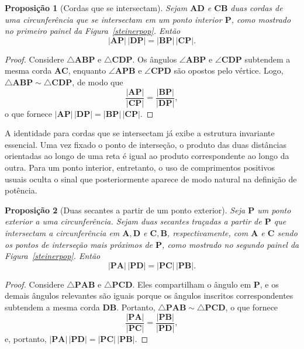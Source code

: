\documentclass[12pt,a4paper]{article}
\newcommand{\pt}[1]{\mathbf{#1}}
\newcommand{\seg}[1]{\mathbf{#1}}
\newcommand{\seglen}[1]{\lvert\mathbf{#1}\rvert}
\newcommand{\be}{\begin{equation}}
\newcommand{\ee}{\end{equation}}
\numberwithin{equation}{section}
\newtheorem{proposition}{Proposição}[section]
\theoremstyle{remark}
\begin{document}
\begin{proposition}[Cordas que se intersectam]
\label{pop2chords}
Sejam $\seg{AD}$ e $\seg{CB}$ duas cordas de uma circunferência que se intersectam em um ponto interior $\pt{P}$, como mostrado no primeiro painel da Figura~\ref{steinerpop}. Então
\be
\seglen{AP}\,\seglen{DP}=\seglen{BP}\,\seglen{CP}.
\ee
\end{proposition}

\begin{proof}
Considere $\triangle \mathbf{ABP}$ e $\triangle \mathbf{CDP}$. Os ângulos $\angle \mathbf{ABP}$ e $\angle \mathbf{CDP}$ subtendem a mesma corda $\seg{AC}$, enquanto $\angle \mathbf{APB}$ e $\angle \mathbf{CPD}$ são opostos pelo vértice. Logo, $\triangle \mathbf{ABP}\sim\triangle \mathbf{CDP}$, de modo que
\be
\frac{\seglen{AP}}{\seglen{CP}}=\frac{\seglen{BP}}{\seglen{DP}},
\ee
o que fornece $\seglen{AP}\,\seglen{DP}=\seglen{BP}\,\seglen{CP}$.
\end{proof}

A identidade para cordas que se intersectam já exibe a estrutura invariante essencial. Uma vez fixado o ponto de interseção, o produto das duas distâncias orientadas ao longo de uma reta é igual ao produto correspondente ao longo da outra. Para um ponto interior, entretanto, o uso de comprimentos positivos usuais oculta o sinal que posteriormente aparece de modo natural na definição de potência.

\begin{proposition}[Duas secantes a partir de um ponto exterior]
\label{pop2sec}
Seja $\pt{P}$ um ponto exterior a uma circunferência. Sejam duas secantes traçadas a partir de $\pt{P}$ que intersectam a circunferência em $\pt{A},\pt{D}$ e $\pt{C},\pt{B}$, respectivamente, com $\pt{A}$ e $\pt{C}$ sendo os pontos de interseção mais próximos de $\pt{P}$, como mostrado no segundo painel da Figura~\ref{steinerpop}. Então
\be
\seglen{PA}\,\seglen{PD}=\seglen{PC}\,\seglen{PB}.
\ee
\end{proposition}

\begin{proof}
Considere $\triangle \mathbf{PAB}$ e $\triangle \mathbf{PCD}$. Eles compartilham o ângulo em $\pt{P}$, e os demais ângulos relevantes são iguais porque os ângulos inscritos correspondentes subtendem a mesma corda $\seg{DB}$. Portanto, $\triangle \mathbf{PAB}\sim\triangle \mathbf{PCD}$, o que fornece
\be
\frac{\seglen{PA}}{\seglen{PC}}=\frac{\seglen{PB}}{\seglen{PD}},
\ee
e, portanto, $\seglen{PA}\,\seglen{PD}=\seglen{PC}\,\seglen{PB}$.
\end{proof}
\end{document}
